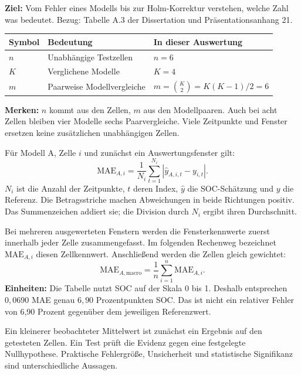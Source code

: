 \textbf{Ziel:} Vom Fehler eines Modells bis zur Holm-Korrektur verstehen, welche Zahl was bedeutet. Bezug: Tabelle A.3 der Dissertation und Präsentationsanhang 21.

\begin{center}\begin{tabular}{lll}\toprule
Symbol & Bedeutung & In dieser Auswertung\\\midrule
$n$ & Unabhängige Testzellen & $n=6$\\
$K$ & Verglichene Modelle & $K=4$\\
$m$ & Paarweise Modellvergleiche & $m=\binom K2=K(K-1)/2=6$\\\bottomrule
\end{tabular}\end{center}
\textbf{Merken:} $n$ kommt aus den Zellen, $m$ aus den Modellpaaren. Auch bei acht Zellen bleiben vier Modelle sechs Paarvergleiche. Viele Zeitpunkte und Fenster ersetzen keine zusätzlichen unabhängigen Zellen.

Für Modell A, Zelle $i$ und zunächst ein Auswertungsfenster gilt:
\[
\mathrm{MAE}_{A,i}=\frac{1}{N_i}\sum_{t=1}^{N_i}
\left|\widehat y_{A,i,t}-y_{i,t}\right|.
\]
$N_i$ ist die Anzahl der Zeitpunkte, $t$ deren Index, $\widehat y$ die SOC-Schätzung und $y$ die Referenz. Die Betragsstriche machen Abweichungen in beide Richtungen positiv. Das Summenzeichen addiert sie; die Division durch $N_i$ ergibt ihren Durchschnitt.

Bei mehreren ausgewerteten Fenstern werden die Fensterkennwerte zuerst innerhalb jeder Zelle zusammengefasst. Im folgenden Rechenweg bezeichnet $\mathrm{MAE}_{A,i}$ diesen Zellkennwert. Anschließend werden die Zellen gleich gewichtet:
\[
\mathrm{MAE}_{A,\mathrm{macro}}=\frac1n\sum_{i=1}^{n}\mathrm{MAE}_{A,i}.
\]
\textbf{Einheiten:} Die Tabelle nutzt SOC auf der Skala 0 bis 1. Deshalb entsprechen $0{,}0690$ MAE genau $6{,}90$ Prozentpunkten SOC. Das ist nicht ein relativer Fehler von 6,90 Prozent gegenüber dem jeweiligen Referenzwert.

Ein kleinerer beobachteter Mittelwert ist zunächst ein Ergebnis auf den getesteten Zellen. Ein Test prüft die Evidenz gegen eine festgelegte Nullhypothese. Praktische Fehlergröße, Unsicherheit und statistische Signifikanz sind unterschiedliche Aussagen.

